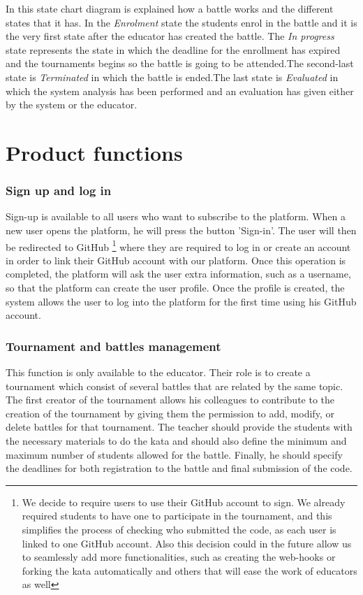 In this state chart diagram is explained how a battle works and the different states that it has. In the\textit{ Enrolment} state the students enrol in the battle and it is the very first state after the educator has created the battle.
The \textit{In progress} state represents the state in which the deadline for the enrollment has expired and the tournaments begins so the battle is going to be attended.The second-last state is \textit{Terminated} in which the battle is ended.The last state is  \textit{Evaluated} in which the system analysis has been performed and an evaluation has given either by the system or the educator.

\section{Product functions}
\subsubsection{Sign up and log in}
Sign-up is available to all users who want to subscribe to the platform. When a new user opens the platform, he will press the button 'Sign-in'. The user will then be redirected to GitHub \footnote{We decide to require users to use their GitHub account to sign. We already required students to have one to participate in the tournament, and this simplifies the process of checking who submitted the code, as each user is linked to one GitHub account. Also this decision could in the future allow us to seamlessly add more functionalities,  such as creating the web-hooks or forking the kata automatically and others that will ease the work of educators as well} where they are required to log in or create an account in order to link their GitHub account with our platform. Once this operation is completed, the platform will ask the user extra information, such as a username, so that the platform can create the user profile. Once the profile is created, the system allows the user to log into the platform for the first time using his GitHub account.\cite{githubOAuth}

\subsubsection{Tournament and battles management}
This function is only available to the educator. Their role is to create a tournament which consist of several battles that are related by the same topic. The first creator of the tournament allows his colleagues to contribute to the creation of the tournament by giving them the permission to add, modify, or delete battles for that tournament.
The teacher should provide the students with the necessary materials to do the kata and should also define the minimum and maximum number of students allowed for the battle. Finally, he should specify the deadlines for both registration to the battle and final submission of the code.


